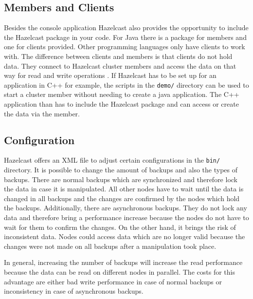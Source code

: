 \subsection*{Members and Clients}
Besides the console application Hazelcast also provides the opportunity to include the Hazelcast package in your code. For Java there is a package for members and one for clients provided. Other programming languages only have clients to work with. The difference between clients and members is that clients do not hold data. They connect to Hazelcast cluster members and access the data on that way for read and write operations \parencite{hazelcastmanual}. If Hazelcast has to be set up for an application in C++ for example, the scripts in the \texttt{demo/} directory can be used to start a cluster member without needing to create a java application. The C++ application than has to include the Hazelcast package and can access or create the data via the member.
\subsection*{Configuration}
Hazelcast offers an XML file to adjust certain configurations in the \texttt{bin/} directory.
It is possible to change the amount of backups and also the types of backups. There are normal backups which are synchronized and therefore lock the data in case it is manipulated. All other nodes have to wait until the data is changed in all backups and the changes are confirmed by the nodes which hold the backups. Additionally, there are asynchronous backups. They do not lock any data and therefore bring a performance increase because the nodes do not have to wait for them to confirm the changes. On the other hand, it brings the risk of inconsistent data. Nodes could access data which are no longer valid because the changes were not made on all backups after a manipulation took place.

In general, increasing the number of backups will increase the read performance because the data can be read on different nodes in parallel. The costs for this advantage are either bad write performance in case of normal backups or inconsistency in case of asynchronous backups.

